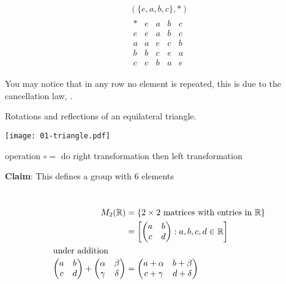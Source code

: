 \begin{example}
\protect\hypertarget{exm:nine}{}\label{exm:nine}

\begin{align*}
    (\{e, a, b, c\}, *) \\
    \begin{array}{c|cccc}
        * & e & a & b & c \\
        \hline
        e & e & a & b & c \\
        a & a & e & c & b \\
        b & b & c & e & a \\
        c & c & b & a & e
    \end{array} 
\end{align*}

You may notice that in any row no element is repeated, this is due to the cancellation law, .
\end{example}

\begin{example}
\protect\hypertarget{exm:triangle}{}\label{exm:triangle}
Rotations and reflections of an equilateral triangle.

{\centering
\texttt{[image: 01-triangle.pdf]}}

operation $\circ =$ do right transformation then left transformation

\textbf{Claim}: This defines a group with 6 elements
\end{example}

\begin{example} ~\vspace*{-1.5\baselineskip}
\begin{align*}
    M_2(\mathbb{R}) &= \{ 2 \times 2 \text{ matrices with entries in } \mathbb{R} \} \\
    &= \left[ \begin{pmatrix} a & b \\ c & d \end{pmatrix} : a, b, c, d \in \mathbb{R} \right] \\
    \intertext{under addition}
    \begin{pmatrix}
    a & b \\
    c & d
    \end{pmatrix} + 
    \begin{pmatrix}
    \alpha & \beta \\
    \gamma & \delta
    \end{pmatrix} &=
    \begin{pmatrix}
    a + \alpha & b + \beta \\
    c + \gamma & d + \delta
    \end{pmatrix}
\end{align*}
\end{example}

